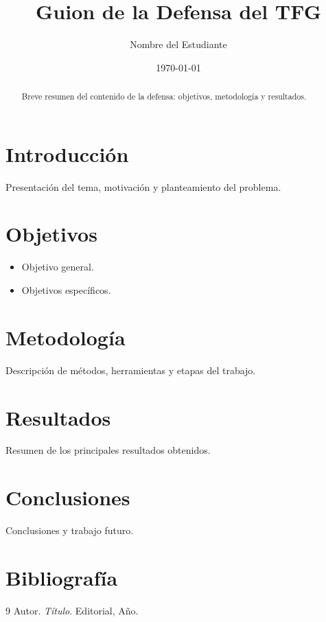 \documentclass[12pt,a4paper]{article}
\title{Guion de la Defensa del TFG}
\author{Nombre del Estudiante}
\date{\today}
\begin{document}
\maketitle

\begin{abstract}
Breve resumen del contenido de la defensa: objetivos, metodología y resultados.
\end{abstract}

\section{Introducción}
Presentación del tema, motivación y planteamiento del problema.

\section{Objetivos}
\begin{itemize}
	\item Objetivo general.
	\item Objetivos específicos.
\end{itemize}

\section{Metodología}
Descripción de métodos, herramientas y etapas del trabajo.

\section{Resultados}
Resumen de los principales resultados obtenidos.

\section{Conclusiones}
Conclusiones y trabajo futuro.

\section*{Bibliografía}
\begin{thebibliography}{9}
 Autor. \textit{Título}. Editorial, Año.
\end{thebibliography}
\end{document}
